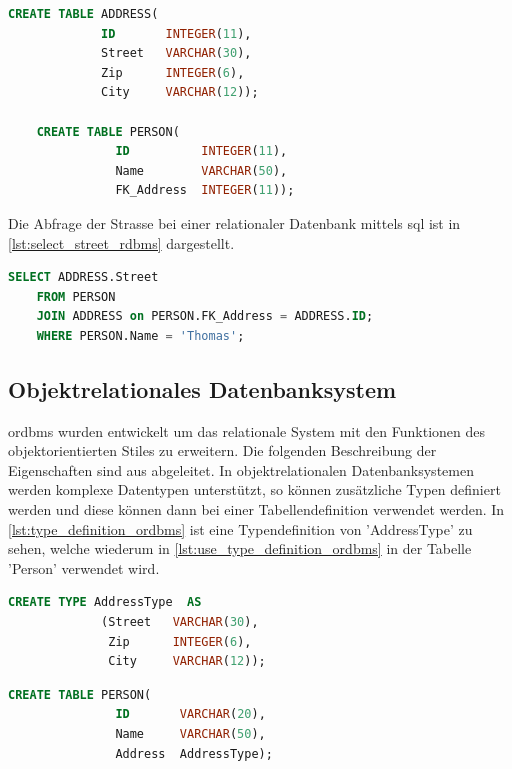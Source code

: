 \begin{lstlisting}[language=SQL, caption=Tabellendefinition in relationalem Datenbanksystem, label=lst:table_definition_rdbms]  
    CREATE TABLE ADDRESS(
             ID       INTEGER(11),
             Street   VARCHAR(30),
             Zip      INTEGER(6),
             City     VARCHAR(12));

    CREATE TABLE PERSON(
               ID          INTEGER(11),
               Name        VARCHAR(50),
               FK_Address  INTEGER(11));
\end{lstlisting}

Die Abfrage der Strasse bei einer relationaler Datenbank mittels \gls{sql} ist in \autoref{lst:select_street_rdbms} dargestellt.

\begin{lstlisting}[language=SQL, caption=Abfrage in relationalem Datenbanksystem, label=lst:select_street_rdbms]  
    SELECT ADDRESS.Street
    FROM PERSON 
    JOIN ADDRESS on PERSON.FK_Address = ADDRESS.ID;
    WHERE PERSON.Name = 'Thomas';
\end{lstlisting}

\subsection{Objektrelationales Datenbanksystem}\label{ordbms}
\gls{ordbms} wurden entwickelt um das relationale System mit den Funktionen des objektorientierten Stiles zu erweitern.
Die folgenden Beschreibung der Eigenschaften sind aus \cite{limited2010introduction} abgeleitet. In objektrelationalen Datenbanksystemen werden 
komplexe Datentypen unterstützt, so können zusätzliche Typen definiert werden und diese können dann bei einer Tabellendefinition verwendet werden.  
In \autoref{lst:type_definition_ordbms} ist eine Typendefinition von 'AddressType' zu sehen, welche wiederum in \autoref{lst:use_type_definition_ordbms} 
in der Tabelle 'Person' verwendet wird.

\begin{lstlisting}[language=SQL, caption=Typendefinition in objektrelationalem Datenbanksystem, label=lst:type_definition_ordbms]  
    CREATE TYPE AddressType  AS
             (Street   VARCHAR(30),
              Zip      INTEGER(6),
              City     VARCHAR(12));
\end{lstlisting}

\begin{lstlisting}[language=SQL, caption=Verwendung von Typendefinition in objektrelationalem Datenbanksystem, label=lst:use_type_definition_ordbms]  
    CREATE TABLE PERSON(
               ID       VARCHAR(20),
               Name     VARCHAR(50),
               Address  AddressType);
\end{lstlisting}

